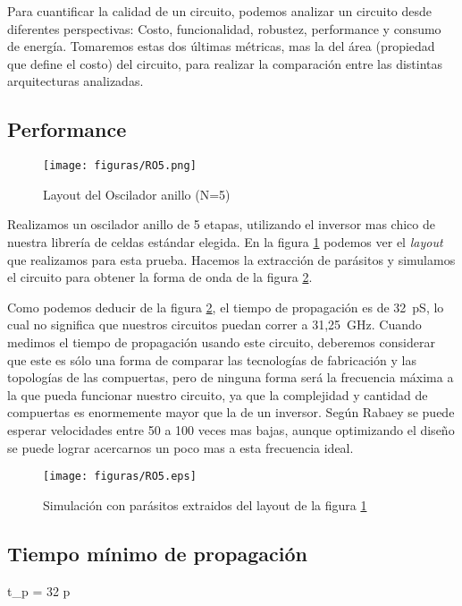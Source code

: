 Para cuantificar la calidad de un circuito, podemos analizar un circuito desde diferentes perspectivas: Costo, funcionalidad, robustez, performance y consumo de energía. Tomaremos estas dos últimas métricas, mas la del área (propiedad que define el costo) del circuito, para realizar la comparación entre las distintas arquitecturas analizadas.

\subsection{Performance}

\begin{figure}[h!]
\vspace{-5pt}
  \centering
\texttt{[image: figuras/RO5.png]}
  \caption{Layout del Oscilador anillo (N=5)}
\label{fig:RO5_lay}
\vspace{-10pt}
\end{figure}

Realizamos un oscilador anillo de 5 etapas, utilizando el inversor mas chico de nuestra librería de celdas estándar elegida. En la figura \ref{fig:RO5_lay} podemos ver el \emph{layout} que realizamos para esta prueba. Hacemos la extracción de parásitos y simulamos el circuito para obtener la forma de onda de la figura \ref{fig:RO5_wf}.

Como podemos deducir de la figura \ref{fig:RO5_wf}, el tiempo de propagación es de 32~pS, lo cual no significa que nuestros circuitos puedan correr a 31,25~GHz. Cuando medimos el tiempo de propagación usando este circuito, deberemos considerar que este es sólo una forma de comparar las tecnologías de fabricación y las topologías de las compuertas, pero de ninguna forma será la frecuencia máxima a la que pueda funcionar nuestro circuito, ya que la complejidad y cantidad de compuertas es enormemente mayor que la de un inversor. Según Rabaey\cite{rabaey2003} se puede esperar velocidades entre 50 a 100 veces mas bajas, aunque optimizando el diseño se puede lograr acercarnos un poco mas a esta frecuencia ideal. 

\begin{figure}[h!]
\vspace{-5pt}
  \centering
\texttt{[image: figuras/RO5.eps]}
  \caption{Simulación con parásitos extraidos del layout de la figura \ref{fig:RO5_lay}}
\label{fig:RO5_wf}
\vspace{-10pt}
\end{figure}


\subsection{Tiempo mínimo de propagación}
t_p = 32 p



